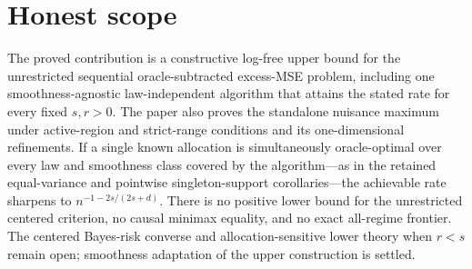 \documentclass{article}
\begin{document}
\section{Honest scope}

The proved contribution is a constructive log-free upper bound for the unrestricted sequential oracle-subtracted excess-MSE problem, including one smoothness-agnostic law-independent algorithm that attains the stated rate for every fixed \(s,r>0\). The paper also proves the standalone nuisance maximum under active-region and strict-range conditions and its one-dimensional refinements. If a single known allocation is simultaneously oracle-optimal over every law and smoothness class covered by the algorithm---as in the retained equal-variance and pointwise singleton-support corollaries---the achievable rate sharpens to \(n^{-1-2s/(2s+d)}\). There is no positive lower bound for the unrestricted centered criterion, no causal minimax equality, and no exact all-regime frontier. The centered Bayes-risk converse and allocation-sensitive lower theory when \(r<s\) remain open; smoothness adaptation of the upper construction is settled.
\end{document}
